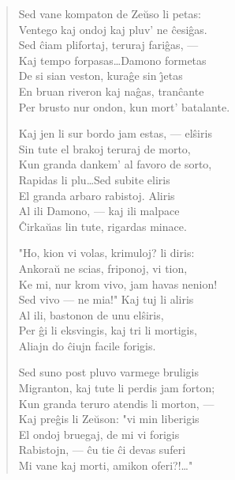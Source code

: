 \begin{verse}
                  Sed vane kompaton de Ze\u uso li petas:\\
                  Ventego kaj ondoj kaj pluv' ne \^cesi\^gas.\\
                  Sed \^ciam plifortaj, teruraj fari\^gas, ---\\
                  Kaj tempo forpasas\dots Damono formetas\\
                  De si sian veston, kura\^ge sin \^{\j}etas\\
                  En bruan riveron kaj na\^gas, tran\^cante\\
                  Per brusto nur ondon, kun mort' batalante.

                  Kaj jen li sur bordo jam estas, --- el\^siris\\
                  Sin tute el brakoj teruraj de morto,\\
                  Kun granda dankem' al favoro de sorto,\\
                  Rapidas li plu\dots Sed subite eliris\\
                  El granda arbaro rabistoj. Aliris\\
                  Al ili Damono, --- kaj ili malpace\\
                  \^Cirka\u uas lin tute, rigardas minace.

                  "Ho, kion vi volas, krimuloj? li diris:\\
                  Ankora\u u ne scias, friponoj, vi tion,\\
                  Ke mi, nur krom vivo, jam havas nenion!\\
                  Sed vivo --- ne mia!" Kaj tuj li aliris\\
                  Al ili, bastonon de unu el\^siris,\\
                  Per \^gi li eksvingis, kaj tri li mortigis,\\
                  Aliajn do \^ciujn facile forigis.

                  Sed suno post pluvo varmege bruligis\\
                  Migranton, kaj tute li perdis jam forton;\\
                  Kun granda teruro atendis li morton, ---\\
                  Kaj pre\^gis li Ze\u uson: "vi min liberigis\\
                  El ondoj bruegaj, de mi vi forigis\\
                  Rabistojn, --- \^cu tie \^ci devas suferi\\
                  Mi vane kaj morti, amikon oferi?!\dots"


\end{verse}
